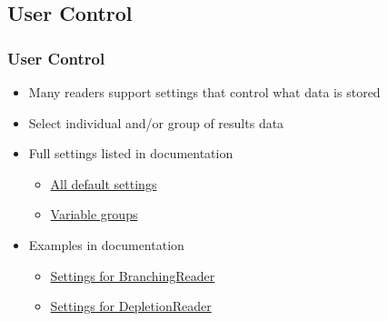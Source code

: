 {    \subsection{User Control}
    \begin{frame}
        \frametitle{User Control}
        \begin{itemize}
            \item Many readers support settings that control what data is stored
            \item Select individual and/or group of results data
            \item Full settings listed in documentation
                \begin{itemize}
                    \item \href{http://serpent-tools.readthedocs.io/en/latest/settingsTop.html\#default-settings}{All default settings}
                    \item \href{http://serpent-tools.readthedocs.io/en/latest/variableGroupsTop.html}{Variable groups}
                \end{itemize}
            \item Examples in documentation
                \begin{itemize}
                    \item \href{http://serpent-tools.readthedocs.io/en/latest/examples/Branching.html\#branching-settings}{Settings for BranchingReader}
                    \item \href{http://serpent-tools.readthedocs.io/en/latest/examples/DepletionReader.html\#depletion-settings}{Settings for DepletionReader}
                \end{itemize}
        \end{itemize}
    \end{frame}

    \backupend
}


